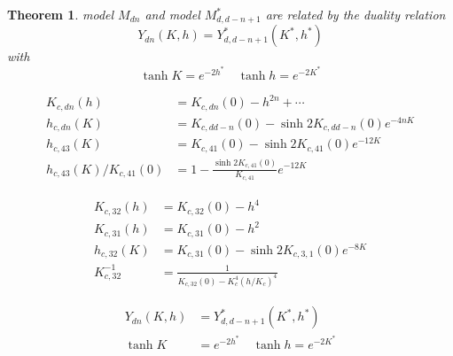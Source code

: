 \documentclass[11pt]{article}
\newtheorem{theorem}{Theorem}
\begin{document}
\begin{theorem}
    model $M_{dn}$ and model $M_{d,d-n+1}^{*}$ are related by the duality relation
    \begin{equation}
        Y_{dn}(K, h) = Y_{d, d-n+1}^{*}(K^*, h^*)
    \end{equation}
    with
    \begin{equation}
        \tanh{K} = e^{-2h^{*}} \quad \tanh{h} = e^{-2K^{*}}
    \end{equation}
\end{theorem}

\begin{equation}
    \begin{aligned}
        K_{c,dn}(h) &= K_{c,dn}(0) - h^{2n} + \cdots\\
        h_{c,dn}(K) &= K_{c,d d-n}(0) - \sinh{2K_{c,d d-n}(0)} e^{-4nK}\\
        h_{c,43}(K) &= K_{c,41}(0) - \sinh{2K_{c,41}(0)} e^{-12K}\\
        h_{c,43}(K)/K_{c,41}(0) &= 1 - \frac{\sinh{2K_{c,41}(0)}}{K_{c,41}} e^{-12K}
    \end{aligned}
\end{equation}

\begin{equation}
    \begin{aligned}
        K_{c,32}(h) &= K_{c,32}(0) - h^{4}\\
        K_{c,31}(h) &= K_{c,31}(0) - h^2\\
        h_{c,32}(K) &= K_{c,31}(0) - \sinh{2K_{c,3,1}(0)} e^{-8K}\\
        K_{c,32}^{-1} &= \frac{1}{K_{c,32}(0) - K_c^4 (h/K_c)^4}
    \end{aligned}
\end{equation}


\newpage

\begin{equation}
    \begin{aligned}
        Y_{dn}(K, h) &= Y_{d,d-n+1}^{*}(K^{*}, h^{*})\\
        \tanh{K} &= e^{-2h^{*}}\quad \tanh{h} = e^{-2K^{*}}\\
    \end{aligned}
\end{equation}
\end{document}
